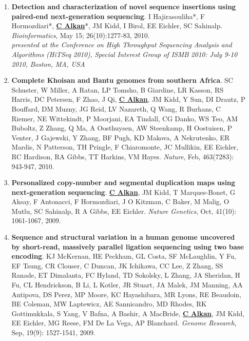 \begin{enumerate}
\item
{\bf Detection and characterization of novel sequence insertions using paired-end next-generation sequencing}.
 I Hajirasouliha*, F Hormozdiari*, {\bf {\underline{C Alkan}}}*, JM Kidd, I Birol, EE Eichler,
 SC Sahinalp.
{\em Bioinformatics}, May 15; 26(10):1277-83, 2010. \\
\hspace*{1cm} {\footnotesize {\em presented at the Conference on High Throughput Sequencing Analysis and Algorithms (HiTSeq 2010), 
    Special Interest Group of ISMB 2010: July 9-10 2010, Boston, MA, USA}}

\clearpage

\item
{\bf Complete Khoisan and Bantu genomes from southern Africa}.
 SC Schuster, W Miller, A Ratan, LP Tomsho, B Giardine, LR Kasson, RS
 Harris, DC Petersen, F Zhao, J Qi, {\bf \underline{C Alkan}}, JM Kidd, Y Sun, DI Drautz, 
P Bouffard, DM Muzny, JG Reid, LV Nazareth, Q Wang, R Burhans, C Riemer, 
NE Wittekindt, P Moorjani, EA Tindall, CG Danko, WS Teo, AM Buboltz, 
Z Zhang, Q Ma, A Oosthuysen, AW Steenkamp, H Oostuisen, P Venter, J 
Gajewski, Y Zhang, BF Pugh, KD Makova, A Nekrutenko, ER Mardis, N Patterson, 
TH Pringle, F Chiaromonte, JC Mullikin, EE Eichler, RC Hardison, RA Gibbs, TT 
Harkins, VM Hayes. 
{\em Nature}, Feb, 463(7283): 943-947, 2010.

\item
{\bf Personalized copy-number and segmental duplication maps using next-generation sequencing}.
{\bf {\underline{C Alkan}}}, JM Kidd, T Marques-Bonet, G Aksay, F Antonacci, F Hormozdiari, J O Kitzman, 
C Baker, M Malig, O Mutlu, SC Sahinalp, R A Gibbs, EE Eichler.  
{\em Nature Genetics},  Oct, 41(10): 1061-1067, 2009.\\


\item
{\bf Sequence and structural variation in a human genome uncovered by short-read, massively parallel ligation sequencing using two base encoding}.
KJ McKernan, HE Peckham, GL Costa, SF McLaughlin, Y Fu, EF Tsung, CR Clouser, C Duncan, JK Ichikawa, CC Lee, Z Zhang, 
SS Ranade, ET Dimalanta,  FC Hyland, TD Sokolsky, L Zhang, JA Sheridan, H Fu, CL Hendrickson, B Li, L Kotler, JR Stuart, 
JA Malek, JM Manning, AA Antipova, DS Perez, MP Moore, KC Hayashibara, MR Lyons, RE Beaudoin, BE Coleman, MW Laptewicz, 
AE Sannicandro, MD Rhodes, RK Gottimukkala, S Yang, V Bafna, A Bashir, A MacBride, {\bf \underline{C Alkan}}, JM Kidd, EE Eichler, 
MG Reese, FM De La Vega, AP Blanchard. 
{\em Genome Research}, Sep, 19(9): 1527-1541, 2009.



\end{enumerate}
